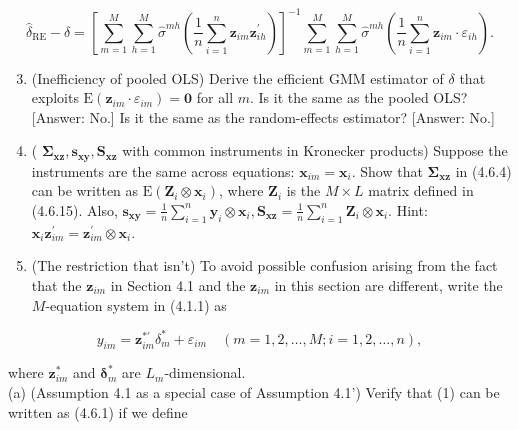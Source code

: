 \documentclass[10pt]{article}
\begin{document}
$$
\hat{\delta}_{\mathrm{RE}}-\delta=\left[\sum_{m=1}^{M} \sum_{h=1}^{M} \hat{\sigma}^{m h}\left(\frac{1}{n} \sum_{i=1}^{n} \mathbf{z}_{i m} \mathbf{z}_{i h}^{\prime}\right)\right]^{-1} \sum_{m=1}^{M} \sum_{h=1}^{M} \hat{\sigma}^{m h}\left(\frac{1}{n} \sum_{i=1}^{n} \mathbf{z}_{i m} \cdot \varepsilon_{i h}\right) .
$$

\begin{enumerate}
  \setcounter{enumi}{2}
  \item (Inefficiency of pooled OLS) Derive the efficient GMM estimator of $\delta$ that exploits $\mathrm{E}\left(\mathbf{z}_{i m} \cdot \varepsilon_{i m}\right)=\mathbf{0}$ for all $m$. Is it the same as the pooled OLS? [Answer: No.] Is it the same as the random-effects estimator? [Answer: No.]
  \item ( $\boldsymbol{\Sigma}_{\mathbf{x z}}, \mathbf{s}_{\mathbf{x y}}, \mathbf{S}_{\mathbf{x z}}$ with common instruments in Kronecker products) Suppose the instruments are the same across equations: $\mathbf{x}_{i m}=\mathbf{x}_{i}$. Show that $\boldsymbol{\Sigma}_{\mathbf{x z}}$ in (4.6.4)\\
can be written as $\mathrm{E}\left(\mathbf{Z}_{i} \otimes \mathbf{x}_{i}\right)$, where $\mathbf{Z}_{i}$ is the $M \times L$ matrix defined in (4.6.15). Also, $\mathbf{s}_{\mathbf{x y}}=\frac{1}{n} \sum_{i=1}^{n} \mathbf{y}_{i} \otimes \mathbf{x}_{i}, \mathbf{S}_{\mathbf{x z}}=\frac{1}{n} \sum_{i=1}^{n} \mathbf{Z}_{i} \otimes \mathbf{x}_{i}$. Hint: $\mathbf{x}_{i} \mathbf{z}_{i m}^{\prime}=\mathbf{z}_{i m}^{\prime} \otimes \mathbf{x}_{i}$.
  \item (The restriction that isn't) To avoid possible confusion arising from the fact that the $\mathbf{z}_{i m}$ in Section 4.1 and the $\mathbf{z}_{i m}$ in this section are different, write the $M$-equation system in (4.1.1) as
\end{enumerate}


\begin{equation*}
y_{i m}=\mathbf{z}_{i m}^{* \prime} \delta_{m}^{*}+\varepsilon_{i m} \quad(m=1,2, \ldots, M ; i=1,2, \ldots, n), \tag{1}
\end{equation*}


where $\mathbf{z}_{i m}^{*}$ and $\boldsymbol{\delta}_{m}^{*}$ are $L_{m}$-dimensional.\\
(a) (Assumption 4.1 as a special case of Assumption 4.1') Verify that (1) can be written as (4.6.1) if we define
\end{document}
